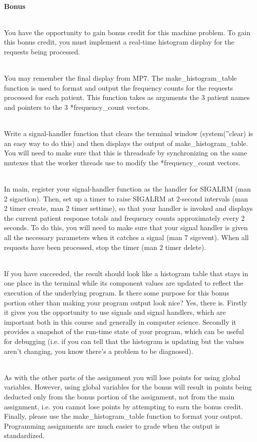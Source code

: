 \documentclass[12pt]{extarticle}
\newenvironment{myindentpar}[1]%
 {\begin{list}{}%
         {\setlength{\leftmargin}{#1}}%
         \item[]%
 }
 {\end{list}}
\begin{document}
\begin{myindentpar}{5mm}
	\ \\
    \textbf{Bonus}	

	\ \\
	You have the opportunity to gain bonus credit for this machine problem. To gain this bonus credit, you must implement a real-time histogram display for the requests being processed. 
	
	\ \\
	You may remember the final display from MP7. The make\_histogram\_table function is used to format and output the frequency counts for the requests processed for each patient. This function takes as arguments the 3 patient names and pointers to the 3 *frequency\_count vectors. 
	
	\ \\	
	Write a signal-handler function that clears the terminal window (system(”clear) is an easy way to do this) and then displays the output of make\_histogram\_table. You will need to make sure that this is threadsafe by synchronizing on the same mutexes that the worker threads use to modify the *frequency\_count vectors. 
	
	\ \\
	In main, register your signal-handler function as the handler for SIGALRM (man 2 sigaction). Then, set up a timer to raise SIGALRM at 2-second intervals (man 2 timer create, man 2 timer settime), so that your handler is invoked and displays the current patient response totals and frequency counts approximately every 2 seconds. To do this, you will need to make sure that your signal handler is given all the necessary parameters when it catches a signal (man 7 sigevent). When all requests have been processed, stop the timer 
(man 2 timer delete). 

	\ \\
	If you have succeeded, the result should look like a histogram table that stays in one place in the terminal while its component values are updated to reflect the execution of the underlying program. 
Is there some purpose for this bonus portion other than making your program output look nice? Yes, there is. Firstly it gives you the opportunity to use signals and signal handlers, which are important both in this course and generally in computer science. Secondly it provides a snapshot of the run-time state of your program, which can be useful for debugging (i.e. if you can tell that the histogram is updating but the values aren’t changing, you know there’s a problem to be diagnosed). 

	\ \\
	As with the other parts of the assignment you will lose points for using global variables. However, using global variables for the bonus will result in points being deducted only from the bonus portion of the assignment, not from the main assignment, i.e. you cannot lose points by attempting to earn the bonus credit. Finally, please use the make\_histogram\_table function to format your output. Programming assignments are much easier to grade when the output is standardized. 


\end{myindentpar}
\end{document}
